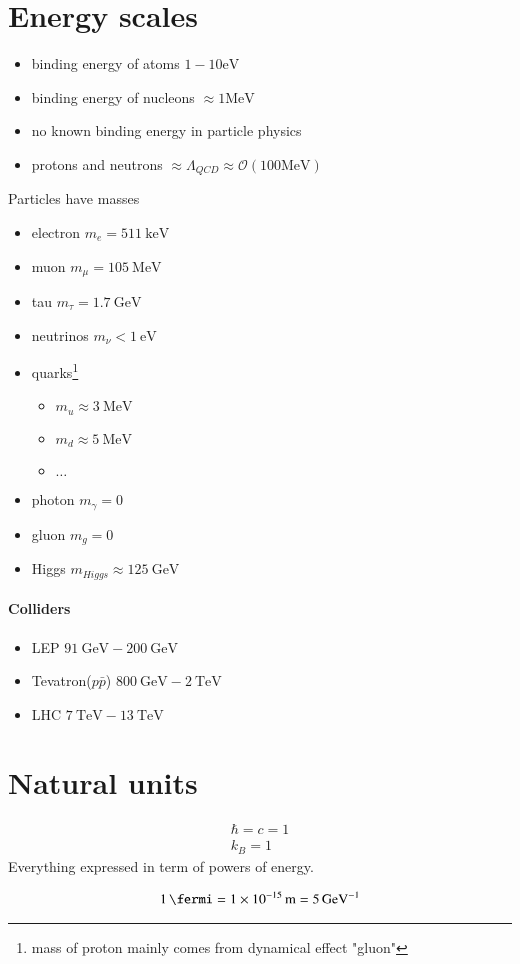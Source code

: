 \section{Energy scales}
\begin{itemize}
   \item binding energy of atoms $1-10 \si{\eV}$
   \item binding energy of nucleons $\approx 1 \si{\mega\eV}$
   \item no known binding energy in particle physics
   \item protons and neutrons $\approx \Lambda_{QCD} \approx \mathcal{O} (100 \si{\mega\eV})$
\end{itemize}

Particles have masses
\begin{itemize}
   \item electron $m_e = \SI{511}{\kilo\eV}$
   \item muon $m_\mu = \SI{105}{\mega\eV}$
   \item tau $m_\tau = \SI{1.7}{\giga\eV}$
   \item neutrinos $m_\nu < \SI{1}{\eV}$ 
   \item quarks\footnote{mass of proton mainly comes from dynamical effect "gluon"} 
      \begin{itemize}
         \item $m_u \approx \SI{3}{\mega\eV}$
         \item $m_d \approx \SI{5}{\mega\eV}$ 
         \item $\dots$
      \end{itemize}
   \item photon $m_\gamma = 0$
   \item gluon $m_g = 0$
   \item Higgs $m_{Higgs} \approx \SI{125}{\giga\eV}$
\end{itemize}

\paragraph{Colliders}
\begin{itemize}
   \item LEP $\SI{91}{\giga\eV} - \SI{200}{\giga\eV}$
   \item Tevatron($p\bar{p}$) $\SI{800}{\giga\eV} - \SI{2}{\tera\eV}$
   \item LHC $\SI{7}{\tera\eV} - \SI{13}{\tera\eV}$
\end{itemize}

\section{Natural units}
\begin{align}
   \hbar = c = 1 \\
   k_B = 1
\end{align}
Everything expressed in term of powers of energy.

\begin{align*}
   \SI{1}{\fermi} = \SI{1e-15}{\m} = \SI{5}{\per\giga\eV}   
\end{align*}
